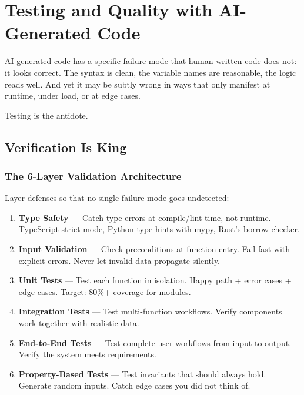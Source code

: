 \chapter{Testing and Quality with AI-Generated Code}
\label{ch:testing}

AI-generated code has a specific failure mode that human-written code does not:
it looks correct. The syntax is clean, the variable names are reasonable,
the logic reads well. And yet it may be subtly wrong in ways that only
manifest at runtime, under load, or at edge cases.

Testing is the antidote.

\section{Verification Is King}
\label{sec:verification}


\subsection{The 6-Layer Validation Architecture}

Layer defenses so that no single failure mode goes undetected:

\begin{enumerate}
  \item \textbf{Type Safety} --- Catch type errors at compile/lint time,
    not runtime. TypeScript strict mode, Python type hints with mypy,
    Rust's borrow checker.

  \item \textbf{Input Validation} --- Check preconditions at function entry.
    Fail fast with explicit errors. Never let invalid data propagate silently.

  \item \textbf{Unit Tests} --- Test each function in isolation.
    Happy path + error cases + edge cases.
    Target: 80\%+ coverage for modules.

  \item \textbf{Integration Tests} --- Test multi-function workflows.
    Verify components work together with realistic data.

  \item \textbf{End-to-End Tests} --- Test complete user workflows
    from input to output. Verify the system meets requirements.

  \item \textbf{Property-Based Tests} --- Test invariants that should always hold.
    Generate random inputs. Catch edge cases you did not think of.
\end{enumerate}


